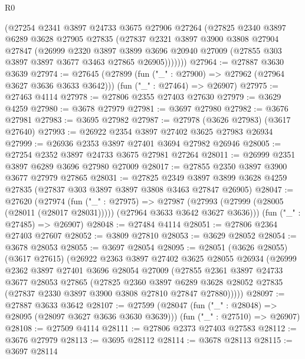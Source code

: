 \begin{lexlean}{R0}
\begin{coremodule}
        (@27254
          @2341
          @3897
          @24733
          @3675
          @27906
          @27264
          (@27825
            @2340
            @3897
            @6289
            @3628
            @27905
            @27835
            (@27837
              @2321
              @3897
              @3900
              @3808
              @27904
              @27847
              (@26999
                @2320
                @3897
                @3899
                @3696
                @20940
                @27009
                (@27855 @303 @3897 @3897 @3677 @3463 @27865 @26905)))))))
@27964 := @27887 @3630 @3639
@27974 := @27645
    (@27899 (fun ("_" : @27900) => @27962 (@27964 @3627 @3636 @3633 @3642)))
    (fun ("_" : @27464) => @26907)
@27975 := @27463 @4114
@27978 := @27806 @2355 @27403 @27630
@27979 := @3629 @4259
@27980 := @3678 @27979
@27981 := @3697 @27980
@27982 := @3676 @27981
@27983 := @3695 @27982
@27987 := @27978 (@3626 @27983) (@3617 @27640)
@27993 := @26922 @2354 @3897 @27402 @3625 @27983 @26934
@27999 := @26936 @2353 @3897 @27401 @3694 @27982 @26946
@28005 := @27254 @2352 @3897 @24733 @3675 @27981 @27264
@28011 := @26999 @2351 @3897 @6289 @3696 @27980 @27009
@28017 := @27855 @2350 @3897 @3900 @3677 @27979 @27865
@28031 := @27825
    @2349
    @3897
    @3899
    @3628
    @4259
    @27835
    (@27837 @303 @3897 @3897 @3808 @3463 @27847 @26905)
@28047 := @27620
    (@27974
      (fun ("_" : @27975) =>
      @27987 (@27993 (@27999 (@28005 (@28011 (@28017 @28031))))) (@27964 @3633 @3642 @3627 @3636)))
    (fun ("_" : @27485) => @26907)
@28048 := @27484 @4114
@28051 := @27806 @2364 @27403 @27607
@28052 := @3809 @27810
@28053 := @3629 @28052
@28054 := @3678 @28053
@28055 := @3697 @28054
@28095 := @28051
    (@3626 @28055)
    (@3617 @27615)
    (@26922
      @2363
      @3897
      @27402
      @3625
      @28055
      @26934
      (@26999
        @2362
        @3897
        @27401
        @3696
        @28054
        @27009
        (@27855
          @2361
          @3897
          @24733
          @3677
          @28053
          @27865
          (@27825
            @2360
            @3897
            @6289
            @3628
            @28052
            @27835
            (@27837 @2330 @3897 @3900 @3808 @27810 @27847 @27880)))))
@28097 := @27887 @3633 @3642
@28107 := @27599
    (@28047 (fun ("_" : @28048) => @28095 (@28097 @3627 @3636 @3630 @3639)))
    (fun ("_" : @27510) => @26907)
@28108 := @27509 @4114
@28111 := @27806 @2373 @27403 @27583
@28112 := @3676 @27979
@28113 := @3695 @28112
@28114 := @3678 @28113
@28115 := @3697 @28114

\end{coremodule}
\end{lexlean}
